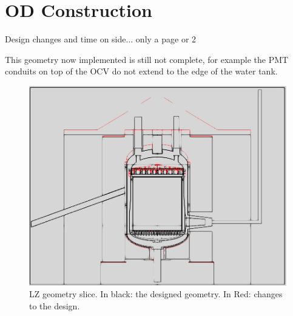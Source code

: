 \section{OD Construction}
\par
Design changes and time on side... only a page or 2


\par
This geometry now implemented is still not complete, for example the PMT conduits on top of the OCV do not extend to the edge of the water tank. 

\begin{figure}[!htbp]
\includegraphics[width=\textwidth]{Figures/Construction/geometry_differences.png}
\centering
\caption{LZ geometry slice. In black: the designed geometry. In Red: changes to the design.}
\label{fig:Geometry_Differences}
\end{figure}

